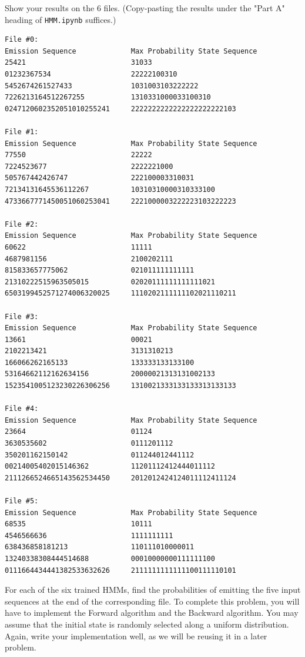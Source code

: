 \documentclass{article}
\begin{document}
Show your results on the 6 files. (Copy-pasting the results under the "Part A" heading of \texttt{HMM.ipynb} suffices.)
\begin{subsolution}

\begin{verbatim}
File #0:
Emission Sequence             Max Probability State Sequence
25421                         31033
01232367534                   22222100310
5452674261527433              1031003103222222
7226213164512267255           1310331000033100310
0247120602352051010255241     2222222222222222222222103

File #1:
Emission Sequence             Max Probability State Sequence
77550                         22222
7224523677                    2222221000
505767442426747               222100003310031
72134131645536112267          10310310000310333100
4733667771450051060253041     2221000003222223103222223

File #2:
Emission Sequence             Max Probability State Sequence
60622                         11111
4687981156                    2100202111
815833657775062               021011111111111
21310222515963505015          02020111111111111021
6503199452571274006320025     1110202111111102021110211

File #3:
Emission Sequence             Max Probability State Sequence
13661                         00021
2102213421                    3131310213
166066262165133               133333133133100
53164662112162634156          20000021313131002133
1523541005123230226306256     1310021333133133313133133

File #4:
Emission Sequence             Max Probability State Sequence
23664                         01124
3630535602                    0111201112
350201162150142               011244012441112
00214005402015146362          11201112412444011112
2111266524665143562534450     2012012424124011112411124

File #5:
Emission Sequence             Max Probability State Sequence
68535                         10111
4546566636                    1111111111
638436858181213               110111010000011
13240338308444514688          00010000000111111100
0111664434441382533632626     2111111111111100111110101
\end{verbatim}

\end{subsolution}
\newpage

\indent\problem[17] %
For each of the six trained HMMs, find the probabilities of emitting the five input sequences at the end of the corresponding file. To complete this problem, you will have to implement the Forward algorithm and the Backward algorithm. You may assume that the initial state is randomly selected along a uniform distribution. Again, write your implementation well, as we will be reusing it in a later problem. \\
\end{document}
